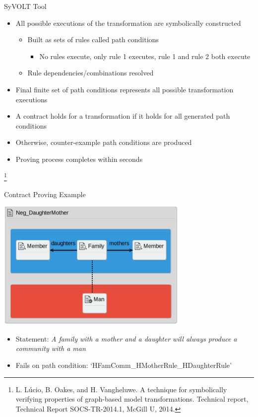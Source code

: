 \documentclass[xcolor=dvipsnames, 12pt, handout]{beamer}
\newcommand\blfootnote[1]{%
  \begingroup
  \renewcommand\thefootnote{}\footnote{#1}%
  \addtocounter{footnote}{-1}%
  \endgroup
}
\begin{document}
\begin{frame}{SyVOLT Tool}
\begin{itemize}[<+->]
\item All possible executions of the transformation are symbolically constructed
\begin{itemize}[<+->]
\item Built as sets of rules called path conditions
\begin{itemize}
\item No rules execute, only rule 1 executes, rule 1 and rule 2 both execute
\end{itemize}
\item Rule dependencies/combinations resolved

\end{itemize}
\item Final finite set of path conditions represents all possible transformation executions

\item A contract holds for a transformation if it holds for all generated path conditions
\item Otherwise, counter-example path conditions are produced
\item Proving process completes within seconds
\end{itemize}
\blfootnote{L. Lúcio, B. Oakes, and H. Vangheluwe. A technique for symbolically verifying properties of graph-based model transformations. Technical report, Technical Report SOCS-TR-2014.1, McGill U, 2014.}
\end{frame}

\begin{frame}{Contract Proving Example}
\begin{center}
\includegraphics[width=0.7\textwidth]{figures/Pos_DaughterMother}
\end{center}
\begin{itemize}[<+->]
\item Statement: \textit{A family with a mother and a daughter will always produce a community with a man}
\item Fails on path condition: `HFamComm\_HMotherRule\_HDaughterRule'
\end{itemize}
\end{frame}
\end{document}

